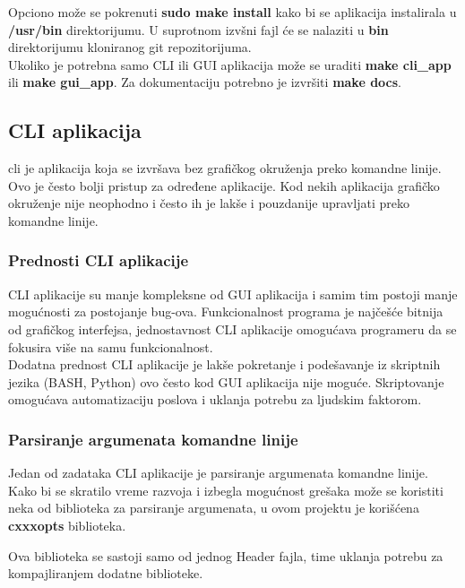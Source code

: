 Opciono može se pokrenuti \textbf{sudo make install} kako bi se aplikacija instalirala u \textbf{/usr/bin}
direktorijumu. U suprotnom izvšni fajl će se nalaziti u \textbf{bin} direktorijumu
kloniranog git repozitorijuma. \\

Ukoliko je potrebna samo CLI ili GUI aplikacija može se uraditi \textbf{make cli\_app}
ili \textbf{make gui\_app}. Za dokumentaciju potrebno je izvršiti \textbf{make docs}.

\subsection{CLI aplikacija}

\gls{cli} je aplikacija koja se izvršava bez grafičkog okruženja preko komandne linije.
Ovo je često bolji pristup za određene aplikacije.
Kod nekih aplikacija grafičko okruženje nije neophodno i često ih je
lakše i pouzdanije upravljati preko komandne linije. \\

\subsubsection{Prednosti CLI aplikacije}
CLI aplikacije su manje kompleksne od GUI aplikacija i
samim tim postoji manje mogućnosti za postojanje bug-ova.
Funkcionalnost programa je najčešće bitnija od grafičkog interfejsa,
jednostavnost CLI aplikacije omogućava programeru da se fokusira više na samu
funkcionalnost. \\

Dodatna prednost CLI aplikacije je lakše pokretanje i podešavanje iz
skriptnih jezika (BASH, Python) ovo često kod GUI aplikacija nije moguće.
Skriptovanje omogućava automatizaciju poslova i uklanja potrebu za ljudskim faktorom.\\

\subsubsection{Parsiranje argumenata komandne linije}

Jedan od zadataka CLI aplikacije je parsiranje argumenata komandne linije.
Kako bi se skratilo vreme razvoja i izbegla mogućnost grešaka može se koristiti
neka od biblioteka za parsiranje argumenata, u ovom projektu je korišćena
\textbf{cxxxopts}\cite{cxxopts} biblioteka.

Ova biblioteka se sastoji samo od jednog Header fajla, time uklanja potrebu za
kompajliranjem dodatne biblioteke.
\newpage

